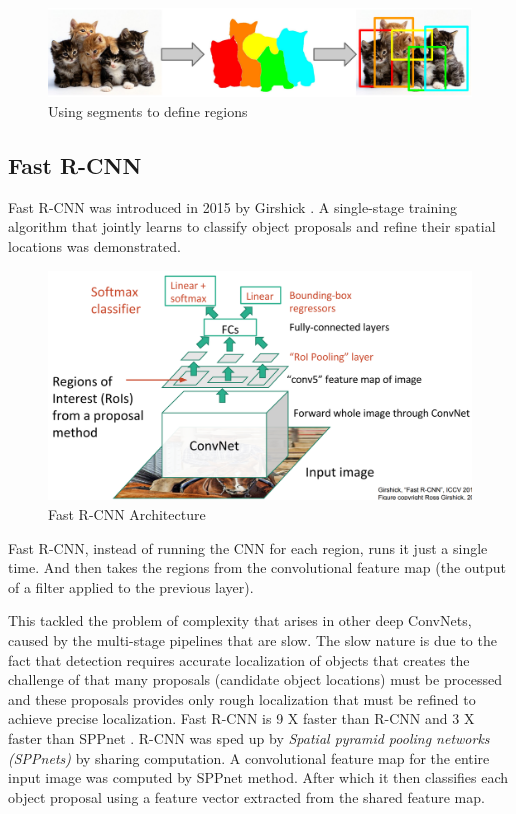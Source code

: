 \begin{figure}[H]
	\centering
	\includegraphics[scale=0.4]{images/segment.PNG}
	\caption{Using segments to define regions}
	\label{f:segment}
\end{figure}

\subsection{Fast R-CNN}\label{s:nnevo-fastrcnn}

Fast R-CNN was introduced in 2015 by Girshick \cite{Girshick_2015}. A single-stage training algorithm that jointly learns to classify object proposals and refine their spatial locations was demonstrated.

\begin{figure}[H]
	\centering
	\includegraphics[scale=0.35]{images/fastrcnn.PNG}
	\caption{Fast R-CNN Architecture}
	\label{f:fastrcnn}
\end{figure}

Fast R-CNN, instead of running the CNN for each region, runs it just a single time. And then takes the regions from the convolutional feature map (the output of a filter applied to the previous layer).

This tackled the problem of complexity that arises in other deep ConvNets, caused by the multi-stage pipelines that are slow. The slow nature is due to the fact that detection requires accurate localization of objects that creates the challenge of that many proposals (candidate object locations) must be processed and these proposals provides only rough localization that must be refined to achieve precise localization. Fast R-CNN is 9 X faster than R-CNN \cite{Girshick_2014} and 3 X faster than SPPnet \cite{he2015spatial}. R-CNN was sped up by \emph{Spatial pyramid pooling networks (SPPnets)}\cite{he2015spatial} by sharing computation. A convolutional feature map for the entire input image was computed by SPPnet method. After which it then classifies each object proposal using a feature vector extracted from the shared feature map. 

